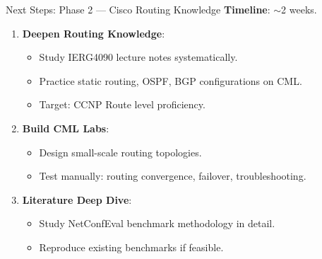 \documentclass[11pt,aspectratio=169]{beamer}
\begin{document}
\begin{frame}{Next Steps: Phase 2 --- Cisco Routing Knowledge}
  \textbf{Timeline}: $\sim$2 weeks.

  \vspace{6pt}
  \begin{enumerate}
    \item \textbf{Deepen Routing Knowledge}:
          \begin{itemize}
            \item Study IERG4090 lecture notes systematically.
            \item Practice static routing, OSPF, BGP configurations on CML.
            \item Target: CCNP Route level proficiency.
          \end{itemize}
    \item \textbf{Build CML Labs}:
          \begin{itemize}
            \item Design small-scale routing topologies.
            \item Test manually: routing convergence, failover, troubleshooting.
          \end{itemize}
    \item \textbf{Literature Deep Dive}:
          \begin{itemize}
            \item Study NetConfEval benchmark methodology in detail.
            \item Reproduce existing benchmarks if feasible.
          \end{itemize}
  \end{enumerate}
\end{frame}
\end{document}
